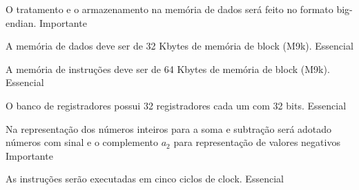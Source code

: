 \begin{nonfunctional}
	  	
        {O tratamento e o armazenamento na memória de dados será feito no formato big-endian.}
        {Importante}
        
        {A memória de dados deve ser de 32 Kbytes de memória de block (M9k).}
        {Essencial}
        
        {A memória de instruções deve ser de 64 Kbytes de memória de block (M9k).}
        {Essencial}
        
        {O banco de registradores possui 32 registradores cada um com 32 bits.}
        {Essencial}
	  
		{Na representação dos números inteiros para a soma e subtração será adotado números com sinal e o complemento $a_{2}$ para representação de valores negativos}
		{Importante}
		
		{As instruções serão executadas em cinco ciclos de clock.}
		{Essencial}		
			  
	  \end{nonfunctional}